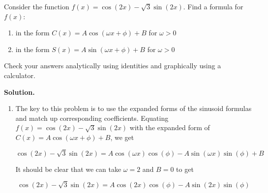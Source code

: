 \begin{ex}  \label{expandedsinusoidex1}  Consider the function $f(x) = \cos(2x) - \sqrt{3} \sin(2x)$. Find a formula for $f(x)$:

\begin{enumerate}

\item  in the form $C(x) = A \cos(\omega x + \phi) + B$ for $\omega > 0$

\item  in the form $S(x) = A \sin(\omega x + \phi) + B$ for $\omega > 0$

\end{enumerate}

Check your answers analytically using identities and graphically using a calculator.

\smallskip

{\bf Solution.}

\begin{enumerate}

\item The key to this problem is to use the expanded forms of the sinusoid formulas and match up corresponding coefficients.  Equating   $f(x) = \cos(2x) - \sqrt{3} \sin(2x)$ with the expanded form of $C(x) = A \cos(\omega x + \phi) + B$, we get

\vspace{-.05in}

\[ \cos(2x) - \sqrt{3} \sin(2x) = A\cos(\omega x) \cos(\phi) - A \sin(\omega x)\sin(\phi) + B\]

It should be clear that we can take $\omega = 2$ and $B = 0$ to get

\[ \cos(2x) - \sqrt{3} \sin(2x) = A\cos(2x) \cos(\phi) - A \sin(2x)\sin(\phi) \]


\end{enumerate}
\end{ex}
